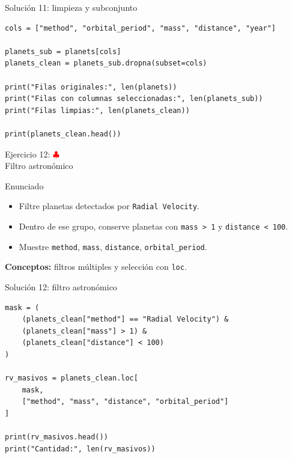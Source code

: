 \documentclass[10pt]{beamer}
\begin{document}
\begin{solutionblock}
\begin{frame}[fragile,shrink=5]{Solución 11: limpieza y subconjunto}
\begin{verbatim}
cols = ["method", "orbital_period", "mass", "distance", "year"]

planets_sub = planets[cols]
planets_clean = planets_sub.dropna(subset=cols)

print("Filas originales:", len(planets))
print("Filas con columnas seleccionadas:", len(planets_sub))
print("Filas limpias:", len(planets_clean))

print(planets_clean.head())
\end{verbatim}
\end{frame}
\end{solutionblock}

\begin{frame}{Ejercicio 12: \hfill \textcolor{red}{$\clubsuit$} \\ Filtro astronómico}
  \begin{block}{Enunciado}
    \begin{itemize}
      \item Filtre planetas detectados por \texttt{Radial Velocity}.
      \item Dentro de ese grupo, conserve planetas con \texttt{mass > 1} y \texttt{distance < 100}.
      \item Muestre \texttt{method}, \texttt{mass}, \texttt{distance}, \texttt{orbital\_period}.
    \end{itemize}
  \end{block}
  \textbf{Conceptos:} filtros múltiples y selección con \texttt{loc}.
\end{frame}

\begin{solutionblock}
\begin{frame}[fragile,shrink=5]{Solución 12: filtro astronómico}
\begin{verbatim}
mask = (
    (planets_clean["method"] == "Radial Velocity") &
    (planets_clean["mass"] > 1) &
    (planets_clean["distance"] < 100)
)

rv_masivos = planets_clean.loc[
    mask,
    ["method", "mass", "distance", "orbital_period"]
]

print(rv_masivos.head())
print("Cantidad:", len(rv_masivos))
\end{verbatim}
\end{frame}
\end{solutionblock}
\end{document}
